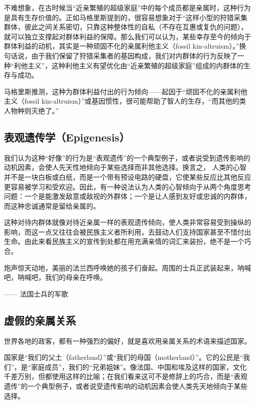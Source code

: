 不难想象，在古时候当“近亲繁殖的超级家庭”中的每个成员都是亲属时，这种行为是具有生存价值的。正如马格里斯提到的，很容易想象对于“这样小型的狩猎采集群体，彼此之间关系密切，只靠这种整体性的自私（不存在互惠或复仇的问题），就可以独立支撑起对群体利益的保障。那么我们可以认为，某些幸存至今的倾向于群体利益的动机，其实是一种顽固不化的亲属利他主义（fossil kin-altruism）。”换句话说，由于我们保留了狩猎采集者的基因构成，我们对内群体的行为反映了一种“利他主义”，这种利他主义有望优化由“近亲繁殖的超级家庭”组成的内群体的生存与成功。

马格里斯推测，这种为群体利益付出的行为倾向——起因于“顽固不化的亲属利他主义（fossil kin-altruism）”或基因惯性，很可能帮助了智人的生存，“而其他的类人物种则灭绝了。” 

\subsection{表观遗传学（Epigenesis）}

我们认为这种“好像”的行为是“表观遗传”的一个典型例子，或者说受到遗传影响的动机因素，会使人先天性地倾向于某些选择而非其他选择。换言之， 人类的心智并不是一块白板或白纸，而是一个带有预设电路的硬盘，它使某些反应比其他反应更容易被学习和受欢迎。因此，有一种说法认为人类的心智倾向于从两个角度思考问题：一个是能激发敌意或敌视的外群体；一个是让人感到友好或忠诚的内群体，而这种忠诚通常是留给亲属的。

这种对待内群体就像对待近亲属一样的表观遗传倾向，使人类非常容易受到操纵的影响，而这一点又往往会被民族主义者所利用，去鼓动人们支持国家甚至不惜付出生命。由此来看民族主义的宣传到处都在用充满亲情的词汇来装扮，绝不是一个巧合。

\begin{tcolorbox}
\kaishu 炮声惊天动地，美丽的法兰西呼唤她的孩子们奋起。周围的士兵正武装起来，呐喊吧，呐喊吧，我们的母亲在呼唤。
\begin{flushright}
—— 法国士兵的军歌
\end{flushright}
\end{tcolorbox}

\subsection{虚假的亲属关系}

世界各地的政客，都有一种强烈的偏好，就是喜欢用亲属关系的术语来描述国家。

国家是“我们的父土（fatherland）”或“我们的母国（motherland）”。它的公民是“我们”，是“家庭成员”，我们的“兄弟姐妹”。像法国、中国和埃及这样的国家，文化千差万别，但都使用这样的比喻；在我们看来这可不是修辞上的巧合，而是“表观遗传”的一个典型例子，或者说受遗传影响的动机因素会使人类先天地倾向于某些选择。

